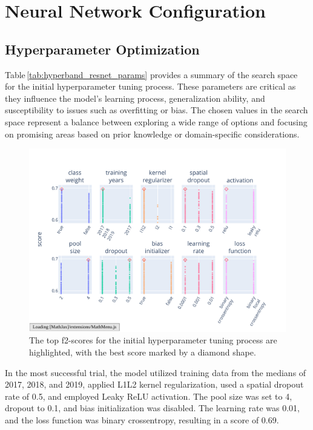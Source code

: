 \chapter{Neural Network Configuration}
\label{chapter:hyper}
\section{Hyperparameter Optimization}




Table\,\ref{tab:hyperband_resnet_params} provides a summary of the search space for the initial hyperparameter tuning process. These parameters are critical as they influence the model's learning process, generalization ability, and susceptibility to issues such as overfitting or bias. The chosen values in the search space represent a balance between exploring a wide range of options and focusing on promising areas based on prior knowledge or domain-specific considerations.

\begin{figure}[ht]
    \centering
    \includegraphics[width=0.9\linewidth, trim={10pt 10pt 40pt 40pt}, clip]{figures/figures_tuner/hyperband_resnet_params.pdf}
    \caption{The top f2-scores for the initial hyperparameter tuning process are highlighted, with the best score marked by a diamond shape.}
    \label{fig:hyperband_resnet_params}
\end{figure}

In the most successful trial, the model utilized training data from the medians of 2017, 2018, and 2019, applied L1L2 kernel regularization, used a spatial dropout rate of 0.5, and employed Leaky ReLU activation. The pool size was set to 4, dropout to 0.1, and bias initialization was disabled. The learning rate was 0.01, and the loss function was binary crossentropy, resulting in a score of 0.69.

